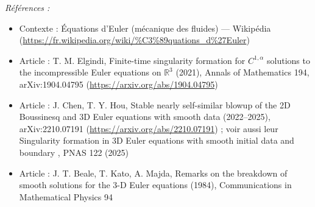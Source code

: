 \documentclass[11pt]{article}
\newenvironment{refs}{\par\small\noindent\emph{Références :}\begin{itemize}\setlength\itemsep{0pt}}{\end{itemize}\normalsize}
\begin{document}
\begin{refs}
\item Contexte : Équations d'Euler (mécanique des fluides) --- Wikipédia (\url{https://fr.wikipedia.org/wiki/%C3%89quations_d%27Euler})
\item Article : T. M. Elgindi, \og{} Finite-time singularity formation for $C^{1,\alpha}$ solutions to the incompressible Euler equations on $\mathbb{R}^3$ \fg{} (2021), Annals of Mathematics 194, arXiv:1904.04795 (\url{https://arxiv.org/abs/1904.04795})
\item Article : J. Chen, T. Y. Hou, \og{} Stable nearly self-similar blowup of the 2D Boussinesq and 3D Euler equations with smooth data \fg{} (2022--2025), arXiv:2210.07191 (\url{https://arxiv.org/abs/2210.07191}) ; voir aussi leur \og{} Singularity formation in 3D Euler equations with smooth initial data and boundary \fg{}, PNAS 122 (2025)
\item Article : J. T. Beale, T. Kato, A. Majda, \og{} Remarks on the breakdown of smooth solutions for the 3-D Euler equations \fg{} (1984), Communications in Mathematical Physics 94
\end{refs}

\bigskip
\end{document}
